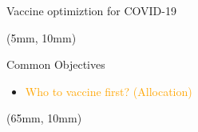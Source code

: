 \begin{frame}{Vaccine optimiztion for COVID-19}
    \begin{textblock*}{50mm}(5mm, 10mm)
        \begin{block}{Common Objectives}
           \begin{itemize}[label=$\mathbf{\star}$]
                \item
                    \textcolor<5>{orange}{
                        Who to vaccine first?    
                        (Allocation)
                    } 
            \end{itemize}
        \end{block}
    \end{textblock*}
%
    \begin{textblock*}{55mm}(65mm, 10mm)
        

\end{textblock*}
\end{frame}
